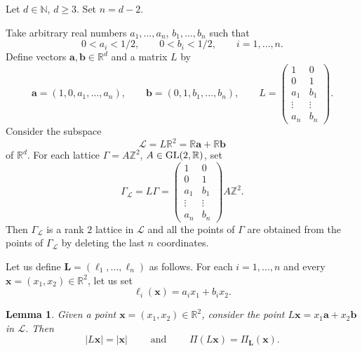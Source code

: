 \documentclass[a4paper,12pt]{article}
\theoremstyle{definition}
\theoremstyle{remark}
\theoremstyle{plain}
\newtheorem{lemma}{Lemma}
\renewcommand{\vec}[1]{\mathbf{#1}}
\renewcommand{\geq}{\geqslant}
\newcommand{\R}{\mathbb{R}}
\newcommand{\Z}{\mathbb{Z}}
\newcommand{\N}{\mathbb{N}}
\newcommand{\Ga}{\Gamma}
\newcommand{\cL}{\mathcal{L}}
\newcommand{\bL}{\mathbf{L}}
\newcommand{\Gl}{\textup{GL}}
\begin{document}
Let $d\in\N$, $d\geq3$. Set $n=d-2$.

Take arbitrary real numbers $a_1,\ldots,a_n$, $b_1,\ldots,b_n$ such that
\begin{equation}\label{eq:bounds_for_a_i_and_b_i}
  0<a_i<1/2,
  \qquad
  0<b_i<1/2,
  \qquad
  i=1,\ldots,n.
\end{equation}
Define vectors $\vec a,\vec b\in\R^d$ and a matrix $L$ by
\[
  \vec a=(1,0,a_1,\ldots,a_n),
  \qquad
  \vec b=(0,1,b_1,\ldots,b_n),
  \qquad
  L=
  \begin{pmatrix}
    1 & 0 \\
    0 & 1 \\
    a_1 & b_1 \\
    \vdots & \vdots \\
    a_n & b_n
  \end{pmatrix}.
\]
Consider the subspace
\[
  \cL=L\R^2=\R\vec a+\R\vec b
\]
of $\R^d$. For each lattice $\Ga=A\Z^2$, $A\in\Gl(2,\R)$, set
\[
  \Ga_\cL=L\Ga=
  \begin{pmatrix}
    1 & 0 \\
    0 & 1 \\
    a_1 & b_1 \\
    \vdots & \vdots \\
    a_n & b_n
  \end{pmatrix}
  A\Z^2.
\]
Then $\Ga_\cL$ is a rank $2$ lattice in $\cL$ and all the points of $\Ga$ are obtained from the points of $\Ga_\cL$ by deleting the last $n$ coordinates.

Let us define $\bL=(\ell_1,\ldots,\ell_n)$ as follows. For each $i=1,\ldots,n$ and every $\vec x=(x_1,x_2)\in\R^2$, let us set
\[
  \ell_i(\vec x)=a_ix_1+b_ix_2.
\]

\begin{lemma}\label{l:lifting_up_the_functionals}
  Given a point $\vec x=(x_1,x_2)\in\R^2$, consider the point $L\vec x=x_1\vec a+x_2\vec b$ in $\cL$. Then
  \[
    |L\vec x|=|\vec x|
    \qquad\text{ and }\qquad
    \Pi(L\vec x)=\Pi_\bL(\vec x).
  \]
\end{lemma}
\end{document}
